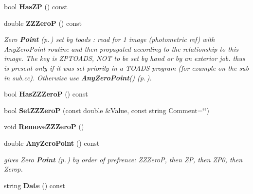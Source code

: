 \begin{CompactItemize}
\item 
{}
bool {\bf Has\-ZP} () const\label{class_reducedimage_a77}

\item 
{}
double {\bf ZZZero\-P} () const\label{class_reducedimage_a78}

\begin{CompactList}\small\item\em Zero {\bf Point} {\rm (p.\,\pageref{class_point})} set by toads : read for 1 image (photometric ref) with Any\-Zero\-Point routine and then propagated according to the relationship to this image. The key is ZPTOADS, NOT to be set by hand or by an exterior job. thus is present only if it was set priorily in a TOADS program (for example on the sub in sub.cc). Otherwise use {\bf Any\-Zero\-Point}() {\rm (p.\,\pageref{class_reducedimage_a82})}.\item\end{CompactList}\item 
{}
bool {\bf Has\-ZZZero\-P} () const\label{class_reducedimage_a79}

\item 
{}
bool {\bf Set\-ZZZero\-P} (const double \&Value, const string Comment=\char`\"{}\char`\"{})\label{class_reducedimage_a80}

\item 
{}
void {\bf Remove\-ZZZero\-P} ()\label{class_reducedimage_a81}

\item 
{}
double {\bf Any\-Zero\-Point} () const\label{class_reducedimage_a82}

\begin{CompactList}\small\item\em gives Zero {\bf Point} {\rm (p.\,\pageref{class_point})} by order of prefrence: ZZZero\-P, then ZP, then ZP0, then Zerop.\item\end{CompactList}\item 
{}
string {\bf Date} () const\label{class_reducedimage_a83}


\end{CompactItemize}
